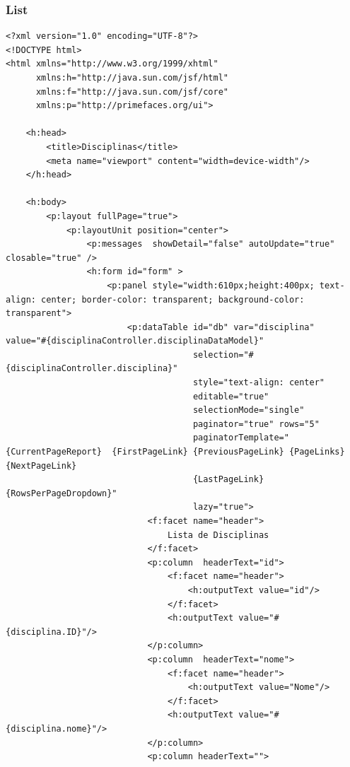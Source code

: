 \documentclass[12pt,a4paper]{article}
\begin{document}
\subsubsection{List}
\label{subsubsectionDisciplinaView}
\begin{lstlisting}
<?xml version="1.0" encoding="UTF-8"?>
<!DOCTYPE html>
<html xmlns="http://www.w3.org/1999/xhtml"
      xmlns:h="http://java.sun.com/jsf/html"
      xmlns:f="http://java.sun.com/jsf/core"
      xmlns:p="http://primefaces.org/ui">

    <h:head>
        <title>Disciplinas</title>
        <meta name="viewport" content="width=device-width"/>
    </h:head>

    <h:body>
        <p:layout fullPage="true">
            <p:layoutUnit position="center">
                <p:messages  showDetail="false" autoUpdate="true" closable="true" />
                <h:form id="form" >
                    <p:panel style="width:610px;height:400px; text-align: center; border-color: transparent; background-color: transparent">  
                        <p:dataTable id="db" var="disciplina"  value="#{disciplinaController.disciplinaDataModel}"
                                     selection="#{disciplinaController.disciplina}"
                                     style="text-align: center" 
                                     editable="true"
                                     selectionMode="single"
                                     paginator="true" rows="5"  
                                     paginatorTemplate="{CurrentPageReport}  {FirstPageLink} {PreviousPageLink} {PageLinks} {NextPageLink} 
                                     {LastPageLink} {RowsPerPageDropdown}"
                                     lazy="true">  
                            <f:facet name="header">  
                                Lista de Disciplinas
                            </f:facet>  
                            <p:column  headerText="id">
                                <f:facet name="header">
                                    <h:outputText value="id"/>
                                </f:facet>
                                <h:outputText value="#{disciplina.ID}"/>
                            </p:column>
                            <p:column  headerText="nome">  
                                <f:facet name="header">
                                    <h:outputText value="Nome"/>
                                </f:facet>
                                <h:outputText value="#{disciplina.nome}"/>
                            </p:column> 
                            <p:column headerText="">

\end{lstlisting}
\end{document}
